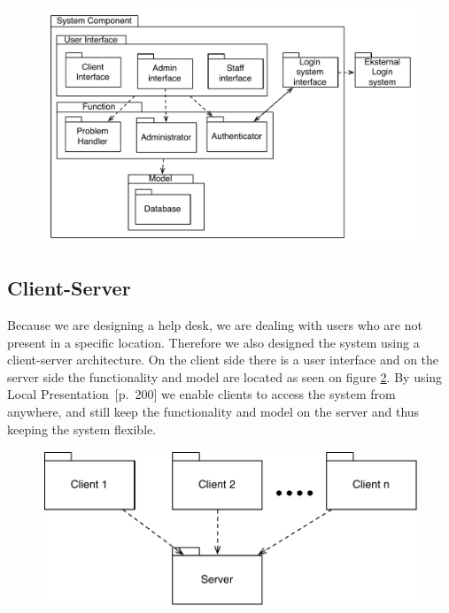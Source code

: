 \begin{figure}
	\centering
	\includegraphics[scale=0.5]{input/architectural_design/system_component_denalternative.pdf}
	\morscaption{}
	\label{fig:AltSystemComponent}
\end{figure}


\subsection{Client-Server}
Because we are designing a help desk, we are dealing with users who are not present in a specific location. Therefore we also designed the system using a client-server architecture.
On the client side there is a user interface and on the server side the functionality and model are located as seen on figure \ref{fig:client-server}. By using Local Presentation~\cite{roedeaalborg}[p.~200] we enable clients to access the system from anywhere, and still keep the functionality and model on the server and thus keeping the system flexible.         


\begin{figure}%
	\includegraphics[scale=0.5]{input/architectural_design/client-server-architecture-pattern.pdf}%
	\morscaption{}
	\label{fig:client-server}%
\end{figure}
